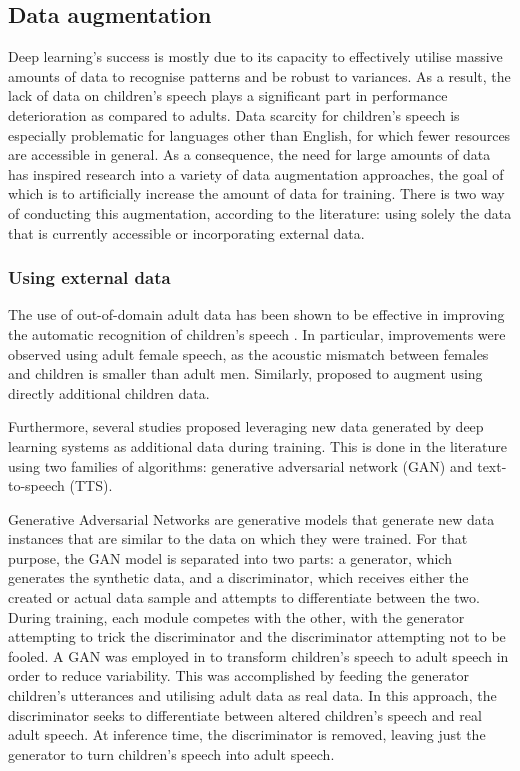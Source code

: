 \subsection{Data augmentation}%
Deep learning's success is mostly due to its capacity to effectively utilise massive amounts of data to recognise patterns and be robust to variances. As a result, the lack of data on children's speech plays a significant part in performance deterioration as compared to adults. Data scarcity for children's speech is especially problematic for languages other than English, for which fewer resources are accessible in general. As a consequence, the need for large amounts of data has inspired research into a variety of data augmentation approaches, the goal of which is to artificially increase the amount of data for training.
There is two way of conducting this augmentation, according to the literature: using solely the data that is currently accessible or incorporating external data.

\subsubsection{Using external data}
The use of out-of-domain adult data has been shown to be effective in improving the automatic recognition of children's speech \cite{adultAUGMENT1, adultAUGMENT2}. In particular, improvements were observed using adult female speech, as the acoustic mismatch between females and children is smaller than adult men.
Similarly, \cite{nonnative} proposed to augment using directly additional children data.

Furthermore, several studies proposed leveraging new data generated by deep learning systems as additional data during training. This is done in the literature using two families of algorithms: generative adversarial network (GAN) and text-to-speech (TTS). 


Generative Adversarial Networks are generative models that generate new data instances that are similar to the data on which they were trained. For that purpose, the GAN model is separated into two parts: a generator, which generates the synthetic data, and a discriminator, which receives either the created or actual data sample and attempts to differentiate between the two. During training, each module competes with the other, with the generator attempting to trick the discriminator and the discriminator attempting not to be fooled. A GAN was employed in \cite{GANS} to transform children's speech to adult speech in order to reduce variability. This was accomplished by feeding the generator children's utterances and utilising adult data as real data. In this approach, the discriminator seeks to differentiate between altered children's speech and real adult speech. At inference time, the discriminator is removed, leaving just the generator to turn children's speech into adult speech.


